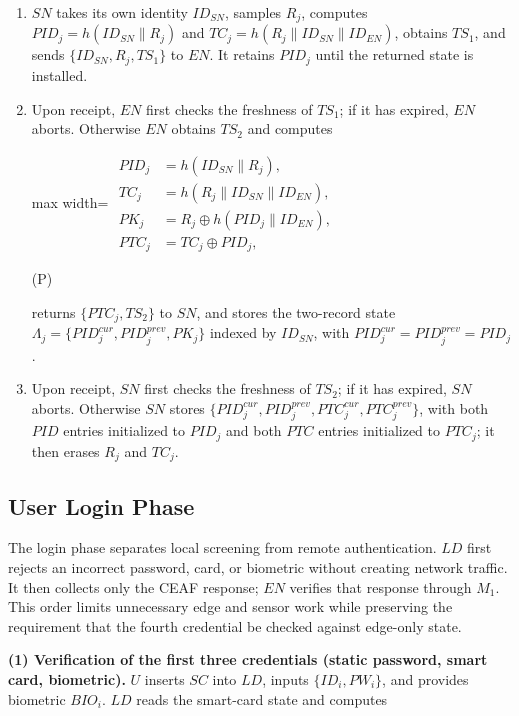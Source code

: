 \documentclass[cmc,article,submit,moreauthors,pdftex]{Definitions/tsp}
\newcommand{\cc}{\mathbin{\|}}
\newcounter{protoeq}
\newenvironment{ceq}{%
  \refstepcounter{protoeq}%
  \par\vspace{-3pt}\setlength{\topsep}{0pt}\setlength{\partopsep}{0pt}\begin{center}%
}{%
  \hspace{0.45em}\textup{(P\theprotoeq)}%
  \end{center}\vspace{-3pt}%
}
\begin{document}
\begin{enumerate}
\item $SN$ takes its own identity $ID_{SN}$, samples $R_j$, computes $PID_j=h(ID_{SN}\cc R_j)$ and $TC_j=h(R_j\cc ID_{SN}\cc ID_{EN})$, obtains $TS_1$, and sends $\{ID_{SN}, R_j, TS_1\}$ to $EN$. It retains $PID_j$ until the returned state is installed.
\item Upon receipt, $EN$ first checks the freshness of $TS_1$; if it has expired, $EN$ aborts. Otherwise $EN$ obtains $TS_2$ and computes

\begin{ceq}
\begin{adjustbox}{max width=\columnwidth}
$\displaystyle\begin{aligned}
PID_j &= h(ID_{SN} \cc R_j),\\
TC_j &= h(R_j \cc ID_{SN} \cc ID_{EN}),\\
PK_j &= R_j \oplus h(PID_j \cc ID_{EN}),\\
PTC_j &= TC_j \oplus PID_j,
\end{aligned}$
\end{adjustbox}
\end{ceq}

returns $\{PTC_j, TS_2\}$ to $SN$, and stores the two-record state $\Lambda_j=\{PID_j^{cur}, PID_j^{prev}, PK_j\}$ indexed by $ID_{SN}$, with $PID_j^{cur}=PID_j^{prev}=PID_j$.

\item Upon receipt, $SN$ first checks the freshness of $TS_2$; if it has expired, $SN$ aborts. Otherwise $SN$ stores $\{PID_j^{cur},PID_j^{prev},PTC_j^{cur},PTC_j^{prev}\}$, with both $PID$ entries initialized to $PID_j$ and both $PTC$ entries initialized to $PTC_j$; it then erases $R_j$ and $TC_j$.
\end{enumerate}

\subsection{User Login Phase}\label{sec:login}

The login phase separates local screening from remote authentication. $LD$ first rejects an incorrect password, card, or biometric without creating network traffic. It then collects only the CEAF response; $EN$ verifies that response through $M_1$. This order limits unnecessary edge and sensor work while preserving the requirement that the fourth credential be checked against edge-only state.

\textbf{(1) Verification of the first three credentials (static password, smart card, biometric).} $U$ inserts $SC$ into $LD$, inputs $\{ID_i, PW_i\}$, and provides biometric $BIO_i$. $LD$ reads the smart-card state and computes
\end{document}

